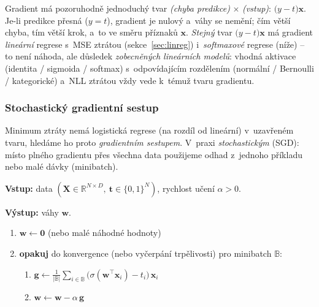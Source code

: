 \begin{intuice}
Gradient má pozoruhodně jednoduchý tvar \emph{(chyba predikce)} $\times$ \emph{(vstup)}: $\big(y-t\big)\mathbf{x}$. Je-li predikce přesná ($y=t$), gradient je nulový a~váhy se nemění; čím větší chyba, tím větší krok, a~to ve směru příznaků $\mathbf{x}$. \emph{Stejný} tvar $\big(y-t\big)\mathbf{x}$ má gradient \emph{lineární} regrese s~MSE ztrátou (sekce~\ref{sec:linreg}) i~\emph{softmaxové} regrese (níže) -- to není náhoda, ale důsledek \emph{zobecněných lineárních modelů}: vhodná aktivace (identita / sigmoida / softmax) s~odpovídajícím rozdělením (normální / Bernoulli / kategorické) a~NLL ztrátou vždy vede k~témuž tvaru gradientu.
\end{intuice}

\subsubsection*{Stochastický gradientní sestup}

Minimum ztráty nemá logistická regrese (na rozdíl od lineární) v~uzavřeném tvaru, hledáme ho proto \emph{gradientním sestupem}. V~praxi \emph{stochastickým} (SGD): místo plného gradientu přes všechna data použijeme odhad z~jednoho příkladu nebo malé dávky (minibatch).

\begin{algo}
\textbf{Vstup:} data $(\mathbf{X}\in\mathbb{R}^{N\times D},\ \mathbf{t}\in\{0,1\}^N)$, rychlost učení $\alpha>0$.\par
\textbf{Výstup:} váhy $\mathbf{w}$.
\begin{enumerate}[label=\arabic*.,leftmargin=2.2em]
  \item $\mathbf{w}\leftarrow\mathbf{0}$ (nebo malé náhodné hodnoty) 
  \item \textbf{opakuj} do konvergence (nebo vyčerpání trpělivosti) pro minibatch $\mathbb{B}$:
  \begin{enumerate}[label=\alph*),leftmargin=2.2em]
    \item $\displaystyle \mathbf{g}\leftarrow\frac{1}{|\mathbb{B}|}\sum_{i\in\mathbb{B}}\big(\sigma(\mathbf{w}^{\!\top}\mathbf{x}_i)-t_i\big)\,\mathbf{x}_i$ 
    \item $\mathbf{w}\leftarrow\mathbf{w}-\alpha\,\mathbf{g}$ 
  \end{enumerate}
\end{enumerate}
\end{algo}

